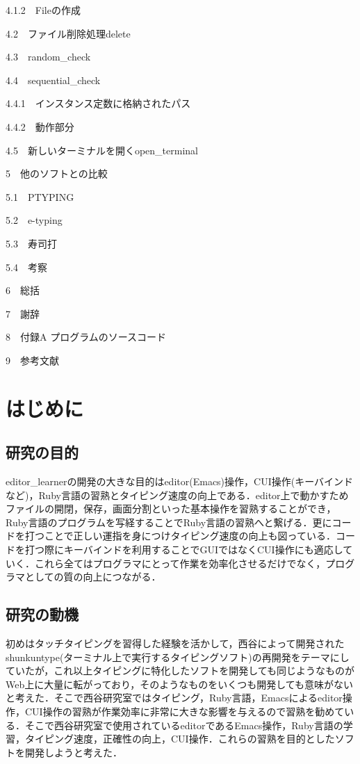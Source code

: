 \documentclass[11pt,dvipdfmx]{jsarticle}
\begin{document}
{{4.1.2~~}Fileの作成}

{{4.2~~}ファイル削除処理delete}

{{4.3~~}random\_check}

{{4.4~~}sequential\_check}

{{4.4.1~~}インスタンス定数に格納されたパス}

{{4.4.2~~}動作部分}

{{4.5~~}新しいターミナルを開くopen\_terminal}

{{5~~}他のソフトとの比較}

{{5.1~~}PTYPING}

{{5.2~~}e-typing}

{{5.3~~}寿司打}

{{5.4~~}考察}

{{6~~}総括}

{{7~~}謝辞}

{{8~~}付録A プログラムのソースコード}

{{9~~}参考文献}

    \section{はじめに}\label{ux306fux3058ux3081ux306b}

    \subsection{研究の目的}\label{ux7814ux7a76ux306eux76eeux7684}

    editor\_learnerの開発の大きな目的はeditor(Emacs)操作，CUI操作(キーバインドなど)，Ruby言語の習熟とタイピング速度の向上である．editor上で動かすためファイルの開閉，保存，画面分割といった基本操作を習熟することができ，Ruby言語のプログラムを写経することでRuby言語の習熟へと繋げる．更にコードを打つことで正しい運指を身につけタイピング速度の向上も図っている．コードを打つ際にキーバインドを利用することでGUIではなくCUI操作にも適応していく．これら全てはプログラマにとって作業を効率化させるだけでなく，プログラマとしての質の向上につながる．

    \subsection{研究の動機}\label{ux7814ux7a76ux306eux52d5ux6a5f}

    初めはタッチタイピングを習得した経験を活かして，西谷によって開発されたshunkuntype(ターミナル上で実行するタイピングソフト)の再開発をテーマにしていたが，これ以上タイピングに特化したソフトを開発しても同じようなものがWeb上に大量に転がっており，そのようなものをいくつも開発しても意味がないと考えた．そこで西谷研究室ではタイピング，Ruby言語，Emacsによるeditor操作，CUI操作の習熟が作業効率に非常に大きな影響を与えるので習熟を勧めている．そこで西谷研究室で使用されているeditorであるEmacs操作，Ruby言語の学習，タイピング速度，正確性の向上，CUI操作．これらの習熟を目的としたソフトを開発しようと考えた．
\end{document}
